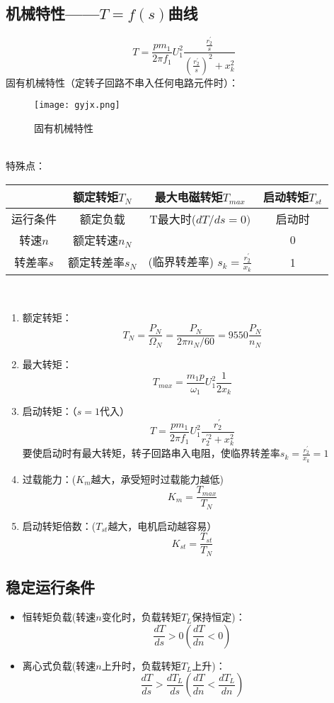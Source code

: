 \documentclass[blue]{elegantnote}
\begin{document}
\subsection{机械特性——$T=f(s)$曲线}
$$T=\frac{pm_1}{2\pi f_1}U_1^{2}\frac{\frac{r_2^{'}}{s}}{(\frac{r_2^{'}}{s})^{2}+x_k^{2}}$$
固有机械特性（定转子回路不串入任何电路元件时）：
\begin{figure}[!hbtp]
	\centering
	\texttt{[image: gyjx.png]}
	\caption{固有机械特性\label{figur:gyjx}}
\end{figure}
\\特殊点：
\begin{table}[!htb]
	\begin{tabular}{|c|c|c|c|}
		\hline
		&   额定转矩$T_N$ &   最大电磁转矩$T_{max}$    &    启动转矩$T_{st}$    \\ \hline
		运行条件 &  额定负载       &   T最大时($dT/ds=0)$      &      	启动时   \\ \hline
		转速$n$  &  额定转速$n_N$  &                            &     0        \\ \hline
		转差率$s$&   额定转差率$s_N$          &  (临界转差率){\color{blue} $s_k=\frac{r_2^{'}}{x_k}$}&   1  \\ \hline           
	\end{tabular}
	\centering
\end{table} 
\\
\begin{enumerate}
	\item 额定转矩： $$T_N=\frac{P_N}{\Omega_N}=\frac{P_N}{2\pi n_N/60}=9550\frac{P_N}{n_N}$$
	\item    最大转矩： $$T_{max}=\frac{m_1p}{\omega_1}U_1^{2}\frac{1}{2x_k}$$
	\item 启动转矩：（$s=1$代入）
	$$T=\frac{pm_1}{2\pi f_1}U_1^{2}\frac{r_2^{'}}{r_2^{'2}+x_k^{2}}$$
	要使启动时有最大转矩，转子回路串入电阻，使临界转差率$s_k=\frac{r_2^{'}}{x_k}=1$
	\item 过载能力：($K_m$越大，承受短时过载能力越低)
	$$K_m=\frac{T_{max}}{T_N}$$
	\item 启动转矩倍数：($T_{st}$越大，电机启动越容易）
	$$K_{st}=\frac{T_{st}}{T_N}$$
\end{enumerate}
\subsection{稳定运行条件}
\begin{itemize}
	\item 恒转矩负载(转速$n$变化时，负载转矩$T_L$保持恒定)：
	$$\frac{dT}{ds}>0(\frac{dT}{dn}<0)$$
	\item 离心式负载(转速$n$上升时，负载转矩$T_L$上升)：
	$$\frac{dT}{ds}>\frac{dT_L}{ds}(\frac{dT}{dn}<\frac{dT_L}{dn})$$
\end{itemize}
\end{document}
